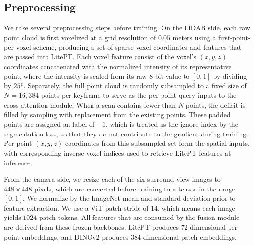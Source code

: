 \documentclass[10pt,twocolumn,letterpaper]{article}
\begin{document}
\subsection{Preprocessing}
We take several preprocessing steps before training. On the LiDAR side, each raw point cloud is first voxelized at a grid resolution of $0.05$ meters using a first-point-per-voxel scheme, producing a set of sparse voxel coordinates and features that are passed into LitePT. Each voxel feature consist of the voxel's $(x, y, z)$ coordinates concatenated with the normalized intensity of its representative point, where the intensity is scaled from its raw $8$-bit value to $[0, 1]$ by dividing by $255$. Separately, the full point cloud is randomly subsampled to a fixed size of $N=16, 384$ points per keyframe to serve as the per point query inputs to the cross-attention module. When a scan contains fewer than $N$ points, the deficit is filled by sampling with replacement from the existing points. These padded points are assigned an label of $-1$, which is treated as the ignore index by the segmentation loss, so that they do not contribute to the gradient during training. Per point $(x, y, z)$ coordinates from this subsampled set form the spatial inputs, with corresponding inverse voxel indices used to retrieve LitePT features at inference. 

From the camera side, we resize each of the six surround-view images to $448 \times 448$ pixels, which are converted before training to a tensor in the range $[0,1]$. We normalize by the ImageNet mean and standard deviation prior to feature extraction. We use a ViT patch stride of $14$, which means each image yields $1024$ patch tokens. All features that are consumed by the fusion module are derived from these frozen backbones. LitePT produces 72-dimensional per point embeddings, and DINOv2 produces 384-dimensional patch embeddings.  


\end{document}
